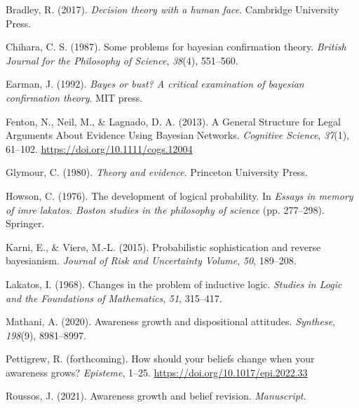\documentclass[
  11pt,
  dvipsnames,enabledeprecatedfontcommands, todos]{scrartcl}
\newlength{\cslhangindent}
\newlength{\cslentryspacingunit} %
\newenvironment{CSLReferences}[2] %
 {%
  \setlength{\parindent}{0pt}
  \ifodd #1
  \let\oldpar\par
  \def\par{\hangindent=\cslhangindent\oldpar}
  \fi
  \setlength{\parskip}{#2\cslentryspacingunit}
 }%
 {}
\begin{document}
\hypertarget{refs}{}
\begin{CSLReferences}{1}{0}
\leavevmode{}%
Bradley, R. (2017). \emph{Decision theory with a human face}. Cambridge
University Press.

\leavevmode{}%
Chihara, C. S. (1987). Some problems for bayesian confirmation theory.
\emph{British Journal for the Philosophy of Science}, \emph{38}(4),
551--560.

\leavevmode{}%
Earman, J. (1992). \emph{Bayes or bust? A critical examination of
bayesian confirmation theory}. MIT press.

\leavevmode{}%
Fenton, N., Neil, M., \& Lagnado, D. A. (2013). A {General Structure}
for {Legal Arguments About Evidence Using Bayesian Networks}.
\emph{Cognitive Science}, \emph{37}(1), 61--102.
\url{https://doi.org/10.1111/cogs.12004}

\leavevmode{}%
Glymour, C. (1980). \emph{Theory and evidence}. Princeton University
Press.

\leavevmode{}%
Howson, C. (1976). The development of logical probability. In
\emph{Essays in memory of imre lakatos. Boston studies in the philosophy
of science} (pp. 277--298). Springer.

\leavevmode{}%
Karni, E., \& Vierø, M.-L. (2015). Probabilistic sophistication and
reverse bayesianism. \emph{Journal of Risk and Uncertainty Volume},
\emph{50}, 189--208.

\leavevmode{}%
Lakatos, I. (1968). Changes in the problem of inductive logic.
\emph{Studies in Logic and the Foundations of Mathematics}, \emph{51},
315--417.

\leavevmode{}%
Mathani, A. (2020). Awareness growth and dispositional attitudes.
\emph{Synthese}, \emph{198}(9), 8981--8997.

\leavevmode{}%
Pettigrew, R. (forthcoming). How should your beliefs change when your
awareness grows? \emph{Episteme}, 1--25.
\url{https://doi.org/10.1017/epi.2022.33}

\leavevmode{}%
Roussos, J. (2021). Awareness growth and belief revision.
\emph{Manuscript}.


\end{CSLReferences}
\end{document}
